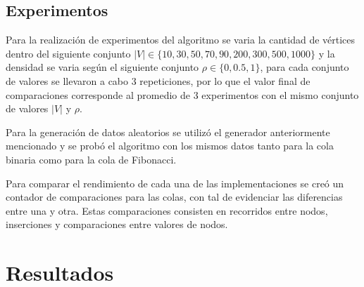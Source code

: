 \documentclass[11pt]{article}
\begin{document}
\subsection{Experimentos}

Para la realización de experimentos del algoritmo se varia la cantidad de vértices dentro del siguiente conjunto $|V| \in \{10, 30, 50, 70, 90, 200, 300, 500, 1000\}$ y la densidad se varia según el siguiente conjunto $\rho \in \{0, 0.5, 1\}$, para cada conjunto de valores se llevaron a cabo 3 repeticiones, por lo que el valor final de comparaciones corresponde al promedio de 3 experimentos con el mismo conjunto de valores $|V|$ y $\rho$.

Para la generación de datos aleatorios se utilizó el generador anteriormente mencionado y se probó el algoritmo con los mismos datos tanto para la cola binaria como para la cola de Fibonacci.

Para comparar el rendimiento de cada una de las implementaciones se creó un contador de comparaciones para las colas, con tal de evidenciar las diferencias entre una y otra. Estas comparaciones consisten en recorridos entre nodos, inserciones y comparaciones entre valores de nodos.

\newpage
\section{Resultados}
\end{document}
